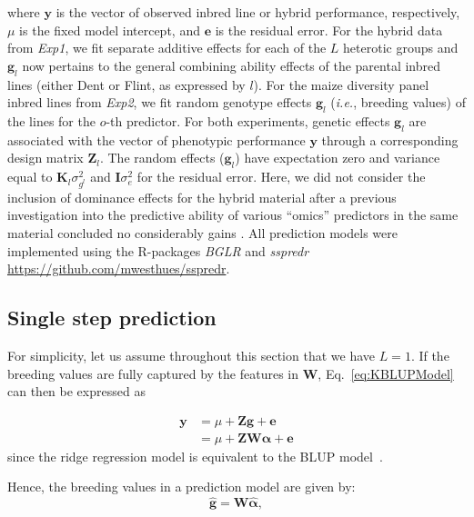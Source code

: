 \documentclass[12pt,titlepage]{article}
\begin{document}
where $\mathbf{y}$ is the vector of observed inbred line or hybrid performance,
respectively, $\mu$ is the fixed model intercept, and $\mathbf{e}$ is the 
residual error.
For the hybrid data from \textit{Exp1}, we fit separate additive effects for 
each of the $L$ heterotic groups and $\mathbf{g}_{l}$ now pertains to the 
general combining ability effects of the parental inbred lines (either Dent or 
Flint, as expressed by $l$).
For the maize diversity panel inbred lines from \textit{Exp2}, we fit random 
genotype effects $\mathbf{g}_{l}$ (\textit{i.e.}, breeding values) of the 
lines for the $o$-th predictor.
For both experiments, genetic effects $\mathbf{g}_{l}$ are associated with 
the vector of phenotypic performance $\mathbf{y}$ through a corresponding 
design matrix $\mathbf{Z}_{l}$.
The random effects ($\mathbf{g}_{l}$) have expectation zero and variance equal 
to $\mathbf{K}_{l} \sigma^{2}_{{g}^{l}}$ and $\mathbf{I} \sigma^2_{e}$ 
for the residual error.
Here, we did not consider the inclusion of dominance effects for the hybrid
material after a previous investigation into the predictive ability of various
``omics'' predictors in the same material concluded no considerably gains 
\cite{Westhues2017}.
All prediction models were implemented using the R-packages \textit{BGLR}
\cite{Perez2014} and \textit{sspredr}
\url{https://github.com/mwesthues/sspredr}. 





\subsection{Single step prediction}
For simplicity, let us assume throughout this section that we have $L=1$.
If the breeding values are fully captured by the features in $\mathbf{W}$,
Eq.~\ref{eq:KBLUPModel} can then be expressed as

\begin{align} \label{eq:KBLUPModelSimplified}
	\mathbf{y} &= \mu + \mathbf{Z} \mathbf{g} + \boldsymbol{e} \\
	&= \mu + \mathbf{Z} \mathbf{W} \boldsymbol{\alpha} + \boldsymbol{e}
\end{align}
\cite{Fernando2014} since the ridge regression model is equivalent to the BLUP
model~\cite{Ruppert2003}.


Hence, the breeding values in a prediction model are given by:
\begin{equation} \label{eq:mrnaebv}
	\mathbf{\hat{g}} = \mathbf{W}\boldsymbol{\hat{\alpha}},
\end{equation}
\end{document}
